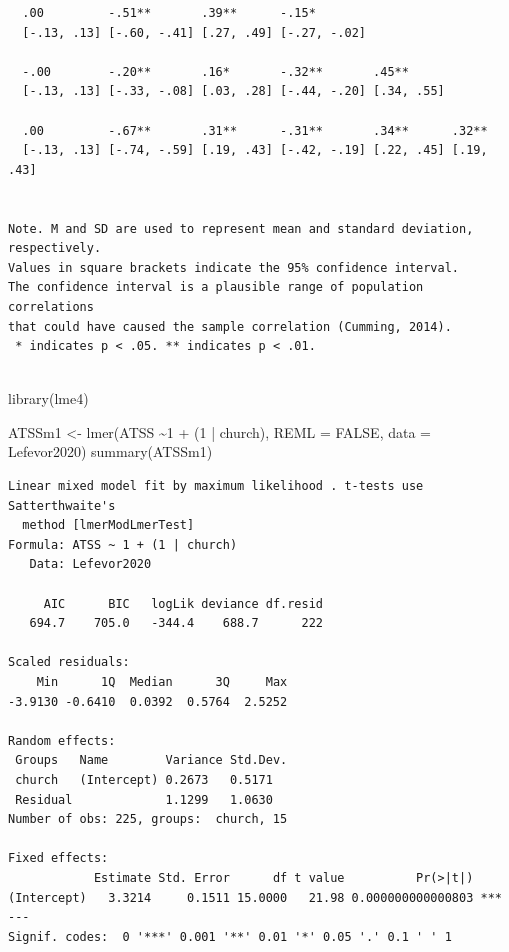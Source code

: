 \documentclass[
  english,
]{book}
\newenvironment{Shaded}{\begin{snugshade}}{\end{snugshade}}
\newcommand{\AttributeTok}[1]{\textcolor[rgb]{0.77,0.63,0.00}{#1}}
\newcommand{\ConstantTok}[1]{\textcolor[rgb]{0.00,0.00,0.00}{#1}}
\newcommand{\DecValTok}[1]{\textcolor[rgb]{0.00,0.00,0.81}{#1}}
\newcommand{\FunctionTok}[1]{\textcolor[rgb]{0.00,0.00,0.00}{#1}}
\newcommand{\NormalTok}[1]{#1}
\newcommand{\OtherTok}[1]{\textcolor[rgb]{0.56,0.35,0.01}{#1}}
\newcommand{\SpecialCharTok}[1]{\textcolor[rgb]{0.00,0.00,0.00}{#1}}
\begin{document}
\begin{verbatim}
  .00         -.51**       .39**      -.15*                             
  [-.13, .13] [-.60, -.41] [.27, .49] [-.27, -.02]                      
                                                                        
  -.00        -.20**       .16*       -.32**       .45**                
  [-.13, .13] [-.33, -.08] [.03, .28] [-.44, -.20] [.34, .55]           
                                                                        
  .00         -.67**       .31**      -.31**       .34**      .32**     
  [-.13, .13] [-.74, -.59] [.19, .43] [-.42, -.19] [.22, .45] [.19, .43]
                                                                        

Note. M and SD are used to represent mean and standard deviation, respectively.
Values in square brackets indicate the 95% confidence interval.
The confidence interval is a plausible range of population correlations 
that could have caused the sample correlation (Cumming, 2014).
 * indicates p < .05. ** indicates p < .01.
 
\end{verbatim}

\begin{Shaded}
\begin{Highlighting}[]
\FunctionTok{library}\NormalTok{(lme4)}

\NormalTok{ATSSm1 }\OtherTok{\textless{}{-}} \FunctionTok{lmer}\NormalTok{(ATSS }\SpecialCharTok{\textasciitilde{}}\DecValTok{1} \SpecialCharTok{+}\NormalTok{ (}\DecValTok{1} \SpecialCharTok{|}\NormalTok{ church), }\AttributeTok{REML =} \ConstantTok{FALSE}\NormalTok{, }\AttributeTok{data =}\NormalTok{ Lefevor2020)}
\FunctionTok{summary}\NormalTok{(ATSSm1)}
\end{Highlighting}
\end{Shaded}

\begin{verbatim}
Linear mixed model fit by maximum likelihood . t-tests use Satterthwaite's
  method [lmerModLmerTest]
Formula: ATSS ~ 1 + (1 | church)
   Data: Lefevor2020

     AIC      BIC   logLik deviance df.resid 
   694.7    705.0   -344.4    688.7      222 

Scaled residuals: 
    Min      1Q  Median      3Q     Max 
-3.9130 -0.6410  0.0392  0.5764  2.5252 

Random effects:
 Groups   Name        Variance Std.Dev.
 church   (Intercept) 0.2673   0.5171  
 Residual             1.1299   1.0630  
Number of obs: 225, groups:  church, 15

Fixed effects:
            Estimate Std. Error      df t value          Pr(>|t|)    
(Intercept)   3.3214     0.1511 15.0000   21.98 0.000000000000803 ***
---
Signif. codes:  0 '***' 0.001 '**' 0.01 '*' 0.05 '.' 0.1 ' ' 1
\end{verbatim}
\end{document}
